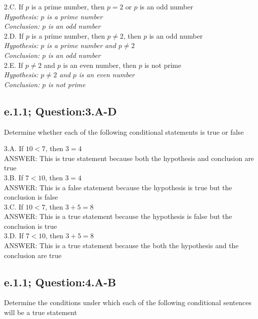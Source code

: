 2.C. If $p$ is a prime number, then $p=2$ or $p$ is an odd number \\
	{\it Hypothesis: $p$ is a prime number} \\
	{\it Conclusion: $p$ is an odd number} \\

2.D. If $p$ is a prime number, then $p \neq 2$, then $p$ is an odd number \\
	{\it Hypothesis: $p$ is a prime number and $p \neq 2$} \\
	{\it Conclusion: $p$ is an odd number} \\

2.E. If $p \neq 2$ and $p$ is an even number, then $p$ is not prime \\
	{\it Hypothesis: $p \neq 2$ and $p$ is an even number} \\
	{\it Conclusion: $p$ is not prime} \\


\subsection{e.1.1; Question:3.A-D}

Determine whether each of the following conditional statements is true or false

3.A. If $10<7$, then $3=4$ \\
	ANSWER: This is true statement because both the hypothesis and conclusion are true \\

3.B. If $7<10$, then $3=4$ \\
	ANSWER: This is a false statement because the hypothesis is true but the conclusion is false \\

3.C. If $10<7$, then $3+5=8$ \\
	ANSWER: This is a true statement because the hypothesis is false but the conclusion is true \\

3.D. If $7<10$, then $3+5=8$ \\
	ANSWER: This is a true statement because the both the hypothesis and the conclusion are true \\


\subsection{e.1.1; Question:4.A-B}

Determine the conditions under which each of the following conditional sentences will be a true statement


